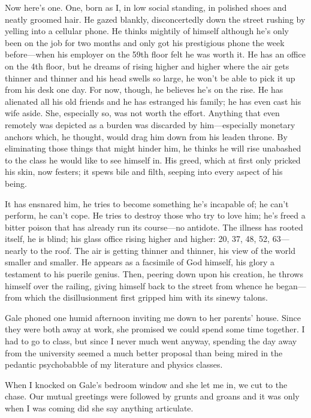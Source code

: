 Now here's one. One, born as I, in low social standing, in polished
shoes and neatly groomed hair. He gazed blankly, disconcertedly down the
street rushing by yelling into a cellular phone. He thinks mightily of
himself although he's only been on the job for two months and only got
his prestigious phone the week before---when his employer on the 59th
floor felt he was worth it. He has an office on the 4th floor, but he
dreams of rising higher and higher where the air gets thinner and
thinner and his head swells so large, he won't be able to pick it up
from his desk one day. For now, though, he believes he's on the rise. He
has alienated all his old friends and he has estranged his family; he
has even cast his wife aside. She, especially so, was not worth the
effort. Anything that even remotely was depicted as a burden was
discarded by him---especially monetary anchors which, he thought, would
drag him down from his leaden throne. By eliminating those things that
might hinder him, he thinks he will rise unabashed to the class he would
like to see himself in. His greed, which at first only pricked his skin,
now festers; it spews bile and filth, seeping into every aspect of his
being.

It has ensnared him, he tries to become something he's incapable of; he
can't perform, he can't cope. He tries to destroy those who try to love
him; he's freed a bitter poison that has already run its course---no
antidote. The illness has rooted itself, he is blind; his glass office
rising higher and higher: 20, 37, 48, 52, 63---nearly to the roof. The
air is getting thinner and thinner, his view of the world smaller and
smaller. He appears as a facsimile of God himself, his glory a testament
to his puerile genius. Then, peering down upon his creation, he throws
himself over the railing, giving himself back to the street from whence
he began---from which the disillusionment first gripped him with its
sinewy talons.

Gale phoned one humid afternoon inviting me down to her parents' house.
Since they were both away at work, she promised we could spend some time
together. I had to go to class, but since I never much went anyway,
spending the day away from the university seemed a much better proposal
than being mired in the pedantic psychobabble of my literature and
physics classes.

When I knocked on Gale's bedroom window and she let me in, we cut to the
chase. Our mutual greetings were followed by grunts and groans and it
was only when I was coming did she say anything articulate.

